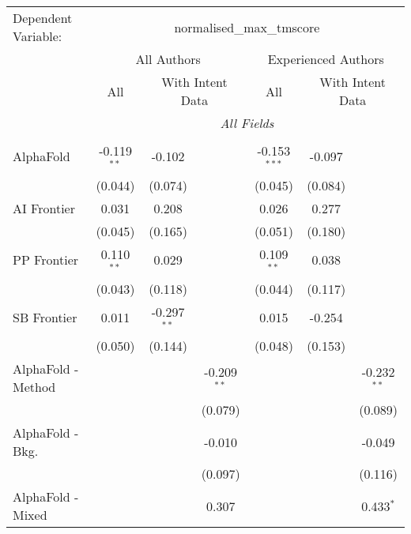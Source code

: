 \begingroup
\centering
\begin{tabular}{lcccccc}
   \tabularnewline \midrule \midrule
   Dependent Variable: & \multicolumn{6}{c}{normalised\_max\_tmscore}\\
 & \multicolumn{3}{c}{All Authors} & \multicolumn{3}{c}{Experienced Authors} \\
\cmidrule(lr){2-4} \cmidrule(lr){5-7}
 & \multicolumn{1}{c}{All} & \multicolumn{2}{c}{With Intent Data} & \multicolumn{1}{c}{All} & \multicolumn{2}{c}{With Intent Data} \\
\cmidrule(lr){2-2} \cmidrule(lr){3-4} \cmidrule(lr){5-5} \cmidrule(lr){6-7}
 & \multicolumn{6}{c}{\textit{All Fields}} \\ \\
   AlphaFold            & -0.119$^{**}$ & -0.102        &                & -0.153$^{***}$ & -0.097  &   \\   
                        & (0.044)       & (0.074)       &                & (0.045)        & (0.084) &   \\   
   AI Frontier          & 0.031         & 0.208         &                & 0.026          & 0.277   &   \\   
                        & (0.045)       & (0.165)       &                & (0.051)        & (0.180) &   \\   
   PP Frontier          & 0.110$^{**}$  & 0.029         &                & 0.109$^{**}$   & 0.038   &   \\   
                        & (0.043)       & (0.118)       &                & (0.044)        & (0.117) &   \\   
   SB Frontier          & 0.011         & -0.297$^{**}$ &                & 0.015          & -0.254  &   \\   
                        & (0.050)       & (0.144)       &                & (0.048)        & (0.153) &   \\   
   AlphaFold - Method   &               &               & -0.209$^{**}$  &                &         & -0.232$^{**}$\\   
                        &               &               & (0.079)        &                &         & (0.089)\\   
   AlphaFold - Bkg.     &               &               & -0.010         &                &         & -0.049\\   
                        &               &               & (0.097)        &                &         & (0.116)\\   
   AlphaFold - Mixed    &               &               & 0.307          &                &         & 0.433$^{*}$\\   

\end{tabular}
